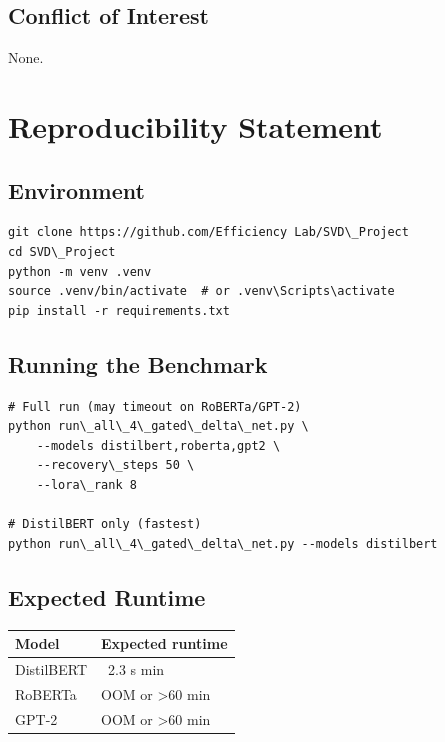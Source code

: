 \subsection{Conflict of Interest}

None.




\section{Reproducibility Statement}

\subsection{Environment}

\begin{lstlisting}
git clone https://github.com/Efficiency Lab/SVD\_Project
cd SVD\_Project
python -m venv .venv
source .venv/bin/activate  # or .venv\Scripts\activate
pip install -r requirements.txt
\end{lstlisting}

\subsection{Running the Benchmark}

\begin{lstlisting}
# Full run (may timeout on RoBERTa/GPT-2)
python run\_all\_4\_gated\_delta\_net.py \
    --models distilbert,roberta,gpt2 \
    --recovery\_steps 50 \
    --lora\_rank 8

# DistilBERT only (fastest)
python run\_all\_4\_gated\_delta\_net.py --models distilbert
\end{lstlisting}

\subsection{Expected Runtime}

\begin{table}[H]
\centering
\small
\begin{tabular}{ll}
\toprule
\textbf{Model} & \textbf{Expected runtime} \\
\midrule
DistilBERT & ~2.3 s min \\
RoBERTa & OOM or \textgreater{}60 min \\
GPT-2 & OOM or \textgreater{}60 min \\
\bottomrule
\end{tabular}
\end{table}

